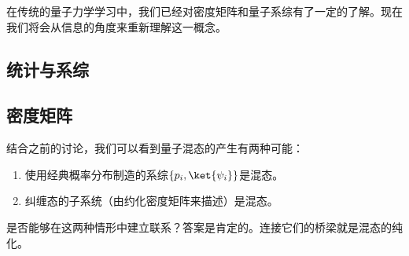 
\begin{issues}
\issueDraft
\issueTODO
\end{issues}




在传统的量子力学学习中，我们已经对密度矩阵和量子系综有了一定的了解。现在我们将会从信息的角度来重新理解这一概念。

\subsection{统计与系综}

\subsection{密度矩阵}

结合之前的讨论，我们可以看到量子混态的产生有两种可能：\begin{enumerate}
\item 使用经典概率分布制造的系综$\{p_i,\ket{\psi_i}\}$是混态。
\item 纠缠态的子系统（由约化密度矩阵来描述）是混态。
\end{enumerate}

是否能够在这两种情形中建立联系？答案是肯定的。连接它们的桥梁就是混态的纯化。